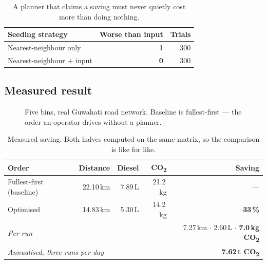 \documentclass[11pt,a4paper]{article}
\newcommand{\co}{CO\textsubscript{2}}
\begin{document}
\begin{table}[h]
\centering\small
\begin{tabular}{lrr}
\toprule
\textbf{Seeding strategy} & \textbf{Worse than input} & \textbf{Trials} \\
\midrule
Nearest-neighbour only        & \textcolor{crit}{\textbf{1}} & 300 \\
Nearest-neighbour $+$ input   & \textcolor{low}{\textbf{0}}  & 300 \\
\bottomrule
\end{tabular}
\caption{A planner that claims a saving must never quietly cost more than
doing nothing.}
\end{table}

\subsection{Measured result}

\begin{figure}[h]
\centering
{}
\caption{Five bins, real Guwahati road network. Baseline is fullest-first
--- the order an operator drives without a planner.}
\end{figure}

\begin{table}[h]
\centering\small
\begin{tabular}{lrrrr}
\toprule
\textbf{Order} & \textbf{Distance} & \textbf{Diesel} & \textbf{\co{}} & \textbf{Saving} \\
\midrule
Fullest-first (baseline) & 22.10\,km & 7.89\,L & 21.2\,kg & --- \\
Optimised                & 14.83\,km & 5.30\,L & 14.2\,kg & \textbf{33\,\%} \\
\midrule
\multicolumn{4}{l}{\emph{Per run}} & 7.27\,km $\cdot$ 2.60\,L $\cdot$ \textbf{7.0\,kg \co{}} \\
\multicolumn{4}{l}{\emph{Annualised, three runs per day}} & \textbf{7.62\,t \co{}} \\
\bottomrule
\end{tabular}
\caption{Measured saving. Both halves computed on the same matrix, so the
comparison is like for like.}
\end{table}
\end{document}
